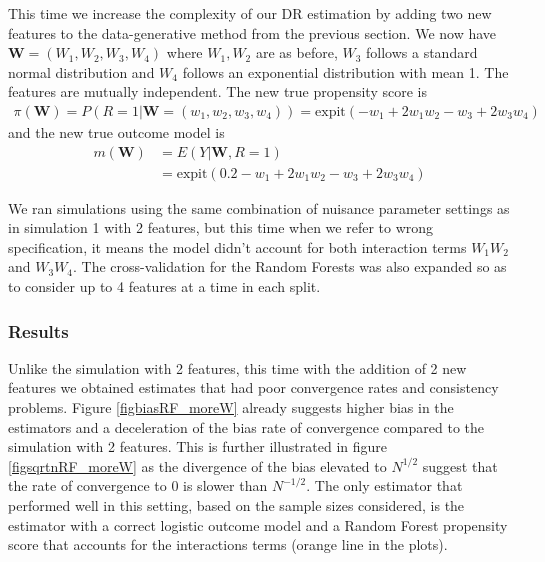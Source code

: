 \documentclass[12pt,twoside]{article}
\newcommand{\expit}{\text{expit}}
\begin{document}
This time we increase the complexity of our DR estimation by adding two new features to the data-generative method from the previous section. We now have $\mathbf{W} = (W_1,W_2,W_3,W_4)$ where $W_1,W_2$ are as before, $W_3$ follows a standard normal distribution and $W_4$ follows an exponential distribution with mean 1. The features are mutually independent. The new true propensity score is 
\begin{align*}
    \pi(\mathbf{W}) = P(R = 1 |\mathbf{W} = (w_1,w_2, w_3,w_4)) = \expit(-w_1 + 2w_1w_2 - w_3 + 2w_3w_4)
\end{align*}
and the new true outcome model is 
\begin{align*}
    m(\mathbf{W}) &= E(Y|\mathbf{W}, R=1) \\
    & = \expit(0.2 - w_1 + 2w_1w_2 - w_3 + 2w_3w_4)
\end{align*}

We ran simulations using the same combination of nuisance parameter settings as in simulation 1 with 2 features, but this time when we refer to wrong specification, it means the model didn't account for both interaction terms $W_1W_2$ and $W_3W_4$. The cross-validation for the Random Forests was also expanded so as to consider up to 4 features at a time in each split. 

\subsubsection*{Results}

Unlike the simulation with 2 features, this time with the addition of 2 new features we obtained estimates that had poor convergence rates and consistency problems. Figure \ref{figbiasRF_moreW} already suggests higher bias in the estimators and a deceleration of the bias rate of convergence compared to the simulation with 2 features. This is further illustrated in figure \ref{figsqrtnRF_moreW} as the divergence of the bias elevated to $N^{1/2}$ suggest that the rate of convergence to 0 is slower than $N^{-1/2}$. The only estimator that performed well in this setting, based on the sample sizes considered, is the estimator with a correct logistic outcome model and a Random Forest propensity score that accounts for the interactions terms (orange line in the plots). 
\end{document}
